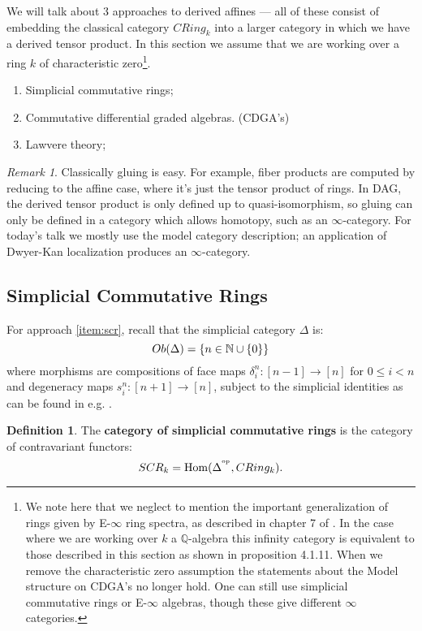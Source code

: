 \documentclass[10pt,a4paper,reqno,oneside]{book} %
\theoremstyle{plain}
\theoremstyle{definition}
\newtheorem{defin}[thm]{Definition}
\theoremstyle{remark}
\newtheorem{rem}[thm]{Remark}
\numberwithin{equation}{section}
\begin{document}
We will talk about 3 approaches to derived affines --- all of these consist of embedding the classical category $CRing_{k}$ into a larger category in which we have a derived tensor product.  In this section we assume that we are working over a ring $k$ of characteristic zero\footnote{We note here that we neglect to mention the important generalization of rings given by E-$\infty$ ring spectra, as described in chapter 7 of \cite{Lurie_Higher_algebra}.  In the case where we are working over $k$ a $\mathbb{Q}$-algebra this infinity category is equivalent to those described in this section as shown in  \cite{Lurie_DAG_V} proposition 4.1.11.  When we remove the characteristic zero assumption the statements about the Model structure on CDGA's no longer hold.  One can still use simplicial commutative rings or E-$\infty$ algebras, though these give different $\infty$ categories.}.
\begin{enumerate}
\item \label{item:scr} Simplicial commutative rings;
\item \label{item:cdga} Commutative differential graded algebras. (CDGA's)
\item \label{item:lawvere} Lawvere theory;
\end{enumerate}

\begin{rem}
Classically gluing is easy. For example, fiber products are computed by reducing to the affine case, where it's just the
tensor product of rings. In DAG, the derived tensor product is only defined up to quasi-isomorphism, so gluing can only be
defined in a category which allows homotopy, such as an $\infty$-category. For today's talk we mostly use the model category description;
an application of Dwyer-Kan localization produces an $\infty$-category.
\end{rem}

\subsection{Simplicial Commutative Rings}

For approach \ref{item:scr}, recall that the simplicial category $\Delta$ is:
\[ 	Ob(\Delta) = \{n \in \mathbb N \cup \{0\} \}		\]
where morphisms are compositions of face maps $\delta_{i}^{n}:[n-1]\rightarrow [n]$ for $0 \leq i < n$ and degeneracy maps $s_{i}^{n}: [n+1]\rightarrow [n]$, subject to the simplicial identities as can be found in e.g. \cite{gillam2013simplicial}. 
\begin{defin}
The \textbf{category of simplicial commutative rings} is the category of contravariant functors:
\[	 SCR_k = \operatorname{Hom}(\Delta^{^\mathrm{op}}, CRing_k).	\] 
\end{defin}
\end{document}
